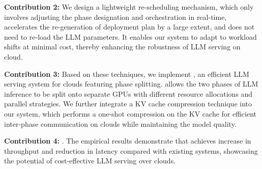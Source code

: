 \textbf{Contribution 2:} We design a lightweight re-scheduling mechanism, which only involves adjusting the phase designation and orchestration in real-time, accelerates the re-generation of deployment plan by a large extent, and does not need to re-load the LLM parameters. It enables our system to adapt to workload shifts at minimal cost, thereby enhancing the robustness of LLM serving on cloud.


\textbf{Contribution 3:} Based on these techniques, we implement \sys, an efficient LLM serving system for clouds featuring phase splitting. \sys allows the two phases of LLM inference to be split onto separate GPUs with different resource allocations and parallel strategies. We further integrate a KV cache compression technique into our system, which performs a one-shot compression on the KV cache for efficient inter-phase communication on clouds while maintaining the model quality.

\textbf{Contribution 4:} . The empirical results demonstrate that \sys achieves  increase in throughput and  reduction in latency compared with existing systems, showcasing the potential of cost-effective LLM serving over clouds.

